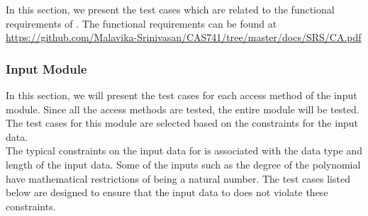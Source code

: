\documentclass[12pt, titlepage]{article}
\begin{document}
In this section, we present the test cases which are related to the functional 
requirements of \famname{}. The functional requirements can be found at 
\url{https://github.com/Malavika-Srinivasan/CAS741/tree/master/docs/SRS/CA.pdf}
 
\subsubsection {Input Module}

In this section, we will present the test cases for each access method of the 
input module. Since all the access methods are tested, the entire module will 
be tested. The test cases for this module are selected based on the constraints 
for the input data. \\
The typical constraints on the input data for \famname{} is associated with the 
data type and length of the input data. Some of the inputs such as the degree 
of the polynomial have mathematical restrictions of being a natural number. The 
test cases listed below are designed to ensure that the input data to 
\famname{} does not violate these constraints.  
\end{document}
